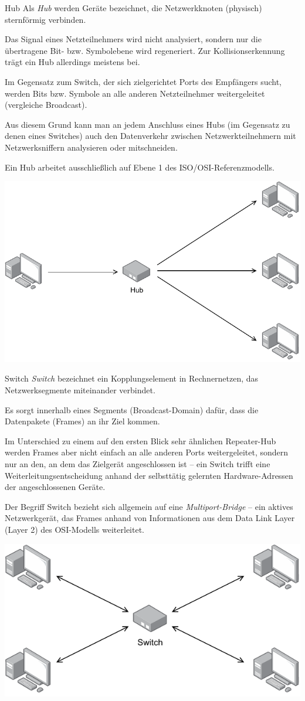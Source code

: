 \begin{defi}{Hub}
    Als \emph{Hub} werden Geräte bezeichnet, die Netzwerkknoten (physisch) sternförmig verbinden.

    Das Signal eines Netzteilnehmers wird nicht analysiert, sondern nur die übertragene Bit- bzw. Symbolebene wird regeneriert.
    Zur Kollisionserkennung trägt ein Hub allerdings meistens bei.

    Im Gegensatz zum Switch, der sich zielgerichtet Ports des Empfängers sucht, werden Bits bzw. Symbole an alle anderen Netzteilnehmer weitergeleitet (vergleiche Broadcast).

    Aus diesem Grund kann man an jedem Anschluss eines Hubs (im Gegensatz zu denen eines Switches) auch den Datenverkehr zwischen Netzwerkteilnehmern mit Netzwerksniffern analysieren oder mitschneiden.

    Ein Hub arbeitet ausschließlich auf Ebene 1 des ISO/OSI-Referenzmodells.

    \centering
    \includegraphics[width=.6\textwidth]{includes/figures/defi_hub.pdf}
\end{defi}

\begin{defi}{Switch}
    \emph{Switch}  bezeichnet ein Kopplungselement in Rechnernetzen, das Netzwerksegmente miteinander verbindet.

    Es sorgt innerhalb eines Segments (Broadcast-Domain) dafür, dass die Datenpakete (Frames) an ihr Ziel kommen.

    Im Unterschied zu einem auf den ersten Blick sehr ähnlichen Repeater-Hub werden Frames aber nicht einfach an alle anderen Ports weitergeleitet, sondern nur an den, an dem das Zielgerät angeschlossen ist – ein Switch trifft eine Weiterleitungsentscheidung anhand der selbsttätig gelernten Hardware-Adressen der angeschlossenen Geräte.

    Der Begriff Switch bezieht sich allgemein auf eine \emph{Multiport-Bridge} – ein aktives Netzwerkgerät, das Frames anhand von Informationen aus dem Data Link Layer (Layer 2) des OSI-Modells weiterleitet.

    \centering
    \includegraphics[width=.4\textwidth]{includes/figures/defi_switch.pdf}
\end{defi}

